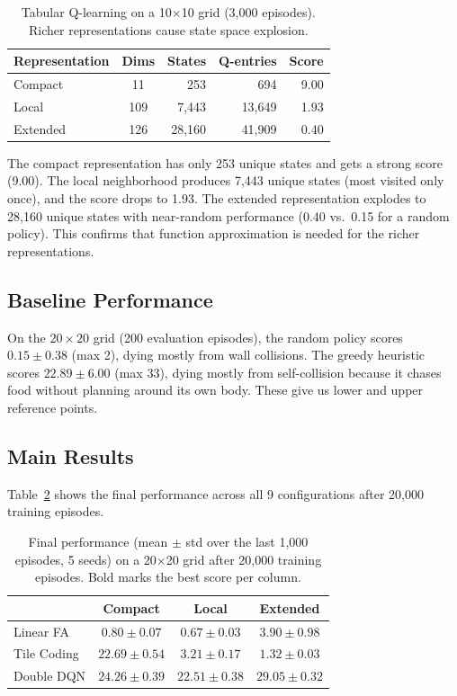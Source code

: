 \documentclass[letterpaper]{article}
\begin{document}
\begin{table}[t]
\centering
\small
\caption{Tabular Q-learning on a 10$\times$10 grid (3,000 episodes). Richer representations cause state space explosion.}
\label{tab:tabular}
\begin{tabular}{lcrrr}
\toprule
Representation & Dims & States & Q-entries & Score \\
\midrule
Compact        & 11   & 253        & 694    & 9.00 \\
Local          & 109  & 7,443      & 13,649 & 1.93 \\
Extended       & 126  & 28,160     & 41,909 & 0.40 \\
\bottomrule
\end{tabular}
\end{table}

The compact representation has only 253 unique states and gets a strong score (9.00). The local neighborhood produces 7,443 unique states (most visited only once), and the score drops to 1.93. The extended representation explodes to 28,160 unique states with near-random performance (0.40 vs.\ 0.15 for a random policy). This confirms that function approximation is needed for the richer representations.

\subsection{Baseline Performance}

On the $20 \times 20$ grid (200 evaluation episodes), the random policy scores $0.15 \pm 0.38$ (max 2), dying mostly from wall collisions. The greedy heuristic scores $22.89 \pm 6.00$ (max 33), dying mostly from self-collision because it chases food without planning around its own body. These give us lower and upper reference points.

\subsection{Main Results}

Table~\ref{tab:main_results} shows the final performance across all 9 configurations after 20,000 training episodes.

\begin{table}[t]
\centering
\small
\caption{Final performance (mean $\pm$ std over the last 1,000 episodes, 5 seeds) on a 20$\times$20 grid after 20,000 training episodes. Bold marks the best score per column.}
\label{tab:main_results}
\begin{tabular}{lccc}
\toprule
 & \textbf{Compact} & \textbf{Local} & \textbf{Extended} \\
\midrule
Linear FA   & $0.80 \pm 0.07$           & $0.67 \pm 0.03$           & $3.90 \pm 0.98$ \\
Tile Coding & $22.69 \pm 0.54$          & $3.21 \pm 0.17$           & $1.32 \pm 0.03$ \\
Double DQN  & $\mathbf{24.26 \pm 0.39}$ & $\mathbf{22.51 \pm 0.38}$ & $\mathbf{29.05 \pm 0.32}$ \\
\bottomrule
\end{tabular}
\end{table}
\end{document}
